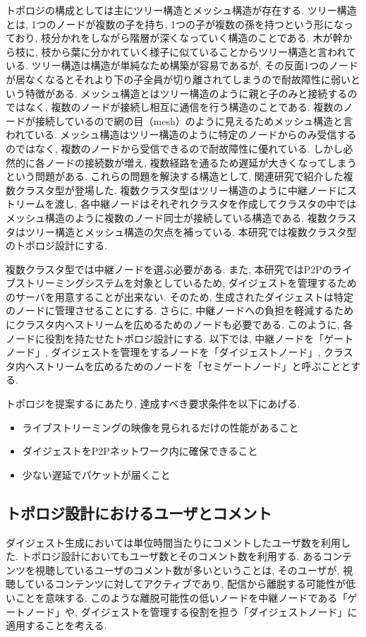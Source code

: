 トポロジの構成としては主にツリー構造とメッシュ構造が存在する. ツリー構造とは, 1つのノードが複数の子を持ち, 1つの子が複数の孫を持つという形になっており, 枝分かれをしながら階層が深くなっていく構造のことである. 木が幹から枝に, 枝から葉に分かれていく様子に似ていることからツリー構造と言われている. ツリー構造は構造が単純なため構築が容易であるが, その反面1つのノードが居なくなるとそれより下の子全員が切り離されてしまうので耐故障性に弱いという特徴がある. メッシュ構造とはツリー構造のように親と子のみと接続するのではなく, 複数のノードが接続し相互に通信を行う構造のことである. 複数のノードが接続しているので網の目（mesh）のように見えるためメッシュ構造と言われている. メッシュ構造はツリー構造のように特定のノードからのみ受信するのではなく, 複数のノードから受信できるので耐故障性に優れている. しかし必然的に各ノードの接続数が増え, 複数経路を通るため遅延が大きくなってしまうという問題がある. これらの問題を解決する構造として, 関連研究で紹介した複数クラスタ型が登場した. 複数クラスタ型はツリー構造のように中継ノードにストリームを渡し, 各中継ノードはそれぞれクラスタを作成してクラスタの中ではメッシュ構造のように複数のノード同士が接続している構造である. 複数クラスタはツリー構造とメッシュ構造の欠点を補っている. 本研究では複数クラスタ型のトポロジ設計にする.

複数クラスタ型では中継ノードを選ぶ必要がある. また, 本研究ではP2Pのライブストリーミングシステムを対象としているため, ダイジェストを管理するためのサーバを用意することが出来ない. そのため, 生成されたダイジェストは特定のノードに管理させることにする. さらに, 中継ノードへの負担を軽減するためにクラスタ内へストリームを広めるためのノードも必要である. このように, 各ノードに役割を持たせたトポロジ設計にする. 以下では, 中継ノードを「ゲートノード」, ダイジェストを管理をするノードを「ダイジェストノード」, クラスタ内へストリームを広めるためのノードを「セミゲートノード」と呼ぶこととする.

トポロジを提案するにあたり, 達成すべき要求条件を以下にあげる.

\begin{itemize}
\item ライブストリーミングの映像を見られるだけの性能があること
\item ダイジェストをP2Pネットワーク内に確保できること
\item 少ない遅延でパケットが届くこと
\end{itemize}

\subsection{トポロジ設計におけるユーザとコメント}
ダイジェスト生成においては単位時間当たりにコメントしたユーザ数を利用した. トポロジ設計においてもユーザ数とそのコメント数を利用する. あるコンテンツを視聴しているユーザのコメント数が多いということは, そのユーザが, 視聴しているコンテンツに対してアクティブであり, 配信から離脱する可能性が低いことを意味する. このような離脱可能性の低いノードを中継ノードである「ゲートノード」や, ダイジェストを管理する役割を担う「ダイジェストノード」に適用することを考える.

